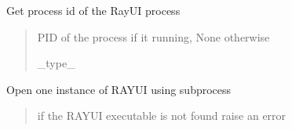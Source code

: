 \documentclass[letterpaper,10pt,english]{sphinxmanual}
\begin{document}
\begin{fulllineitems}

\begin{fulllineitems}
\label{\detokenize{index:raypyng.runner.RayUIRunner.pid}}
\pysigstartsignatures
{}
\pysigstopsignatures
\sphinxAtStartPar
Get process id of the RayUI process
\begin{quote}\begin{description}
\sphinxAtStartPar
PID of the process if it running, None otherwise

\sphinxAtStartPar
\_type\_

\end{description}\end{quote}

\end{fulllineitems}


\begin{fulllineitems}
\label{\detokenize{index:raypyng.runner.RayUIRunner.run}}
\pysigstartsignatures
{}
\pysigstopsignatures
\sphinxAtStartPar
Open one instance of RAY\sphinxhyphen{}UI using subprocess
\begin{quote}\begin{description}
\sphinxAtStartPar
{} \textendash{} if the RAY\sphinxhyphen{}UI executable is not found raise an error

\end{description}\end{quote}

\end{fulllineitems}


\end{fulllineitems}




\renewcommand{\indexname}{Index}
\printindex
\end{document}
